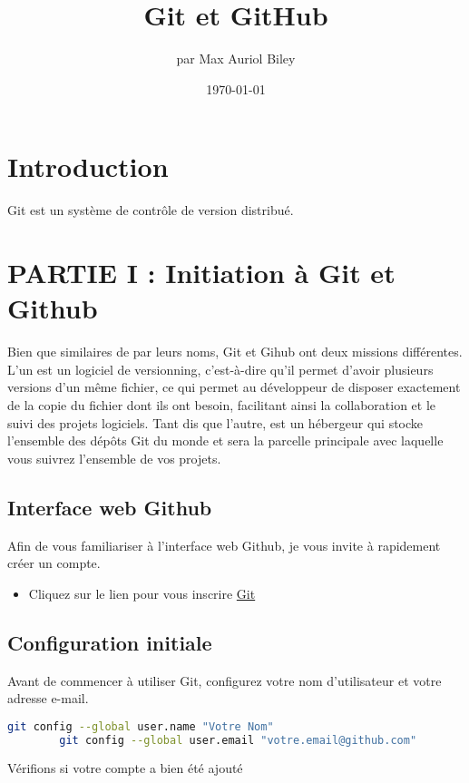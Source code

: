 \documentclass{article}
\title{Git et GitHub}
\author{par Max Auriol Biley}
\date{\today}
\begin{document}
	
	\maketitle
	
	\section{Introduction }
	Git est un système de contrôle de version distribué.
	
	\section{PARTIE I : Initiation à Git et Github}
	
	Bien que similaires de par leurs noms, Git et Gihub ont deux missions différentes. 
	L’un est un logiciel de versionning, c’est-à-dire qu’il permet d’avoir plusieurs versions d’un même fichier, ce qui permet au développeur de disposer exactement de la copie du fichier dont ils ont besoin, facilitant ainsi la collaboration et le suivi des projets logiciels. Tant dis que l'autre, est un hébergeur qui  stocke l’ensemble des dépôts Git du monde et sera la parcelle principale avec laquelle vous suivrez l’ensemble de vos projets.
	
	\subsection{Interface web Github}
	
Afin de vous familiariser à l'interface web Github, je vous invite à rapidement créer un compte.
	\begin{itemize}
		\item Cliquez sur le lien pour vous inscrire \href{https://github.com/}{Git}
	\end{itemize}
	
	\subsection{Configuration initiale}
	Avant de commencer à utiliser Git, configurez votre nom d'utilisateur et votre adresse e-mail.
	
	\begin{lstlisting}[language=bash]
		git config --global user.name "Votre Nom"
		git config --global user.email "votre.email@github.com"
	\end{lstlisting}
	
	Vérifions si votre compte a bien été ajouté
	
\end{document}
